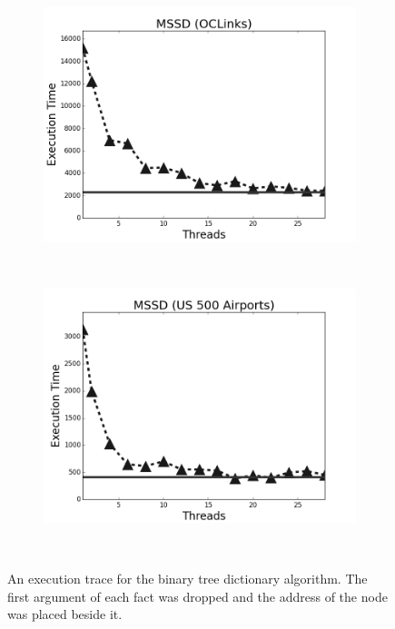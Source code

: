 \begin{figure}[h]
\begin{subfigure}[b]{0.5\textwidth}
                \label{fig:implementation:scale_sssp_uspowergrid}
        \end{subfigure}\\
        \begin{subfigure}[b]{0.5\textwidth}
                \includegraphics[width=\textwidth]{experiments/scalability/scale-shortest-oclinks.png}
                \label{fig:implementation:scale_sssp_oclinks}
        \end{subfigure}%
        ~
        \begin{subfigure}[b]{0.5\textwidth}
                \includegraphics[width=\textwidth]{experiments/scalability/scale-shortest-usairports500.png}

                \label{fig:implementation:scale_sssp_usairports}
        \end{subfigure}\\
        \caption{An execution trace for the binary tree dictionary
           algorithm. The first argument of each fact was dropped and the
           address of the node was placed beside it.}
        \label{fig:implementation:scale2}
\end{figure}
